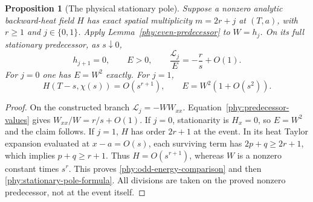 \documentclass[11pt]{article}
\numberwithin{equation}{section}
\newtheorem{proposition}[theorem]{Proposition}
\theoremstyle{definition}
\theoremstyle{remark}
\begin{document}
\begin{proposition}[The physical stationary pole]
\label{phy:stationary-pole}
Suppose a nonzero analytic backward-heat field $H$ has exact spatial
multiplicity $m=2r+j$ at $(T,a)$, with $r\ge1$ and $j\in\{0,1\}$.
Apply Lemma~\ref{phy:even-predecessor} to $W=h_j$.  On its full stationary
predecessor, as $s\downarrow0$,
\begin{equation}
 h_{j+1}=0,\qquad E>0,\qquad
 \frac{\mathcal L_j}{E}=-\frac{r}{s}+O(1).
 \label{phy:stationary-pole-formula}
\end{equation}
For $j=0$ one has $E=W^2$ exactly.  For $j=1$,
\begin{equation}
 H(T-s,\chi(s))=O(s^{r+1}),\qquad
 E=W^2(1+O(s^2)).
 \label{phy:odd-energy-comparison}
\end{equation}
\end{proposition}
\begin{proof}
On the constructed branch $\mathcal L_j=-W W_{xx}$.
Equation~\eqref{phy:predecessor-values} gives
$W_{xx}/W=r/s+O(1)$.  If $j=0$, stationarity is $H_x=0$, so
$E=W^2$ and the claim follows.  If $j=1$, $H$ has order $2r+1$ at the
event.  In its heat Taylor expansion evaluated at $x-a=O(s)$, each
surviving term has $2p+q\ge2r+1$, which implies $p+q\ge r+1$.
Thus $H=O(s^{r+1})$, whereas $W$ is a nonzero constant times $s^r$.
This proves \eqref{phy:odd-energy-comparison} and then
\eqref{phy:stationary-pole-formula}.  All divisions are taken on the
proved nonzero predecessor, not at the event itself.
\end{proof}
\end{document}
